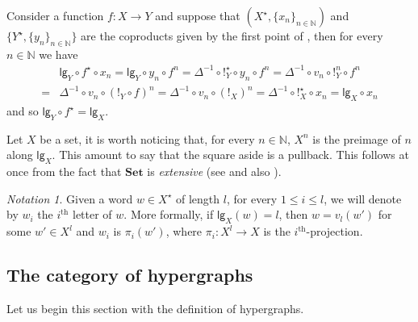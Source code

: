 \documentclass[3p]{elsarticle}
\newcommand{\lgh}{\mathsf{lg}}
\newcommand{\Set}{\mathbf{Set}}
\theoremstyle{remark}
\newtheorem*{notaz}{Notation}
\theoremstyle{definition}
\begin{document}
\begin{rem}\label{rem:le} Consider a function $f\colon X\to Y$  and suppose that $(X^\star, \{x_n\}_{n\in \mathbb{N}})$ and $\{Y^\star, \{y_n\}_{n\in \mathbb{N}}\}$ are the coproducts given by the first point of , then for every $n\in \mathbb{N}$ we have 
	\begin{align*}
&\lgh_{Y}\circ f^\star \circ x_n = \lgh_{Y}\circ y_n \circ f^n= \Delta^{-1}\circ !^\star_{Y} \circ y_n\circ f^n =  \Delta^{-1}\circ v_n \circ !^n_{Y} \circ f^n \\=& \Delta^{-1}\circ v_n \circ (!_{Y} \circ f)^n  = \Delta^{-1}\circ v_n \circ (!_{X})^n = \Delta^{-1}\circ !^\star_{X} \circ x_n = \lgh_{X}\circ x_n
	\end{align*}
and so $\lgh_{Y}\circ f^\star= \lgh_{X}$.
\end{rem}

\noindent
\begin{minipage}[r]{.83\linewidth}
	\begin{rem}\label{rem:len} Let $X$ be a set, it is worth noticing that, for every $n\in \mathbb{N}$, $X^n$ is the preimage of $n$ along $\lgh_{X}$. This amount to say that the square aside is a pullback. This follows at once from the fact that $\Set$ is \emph{extensive} (see \cite{carboni1993introduction} and also ). 
	\end{rem}
\end{minipage}\hfill \begin{minipage}[l]{.15\linewidth} \vspace{-.2cm}
\xymatrix@R=13pt{X^n \ar@{>->}[r]^{v_n} \ar[d]^{!_{X^n}}& X^\star  \ar[d]^{\lgh_{X}}\\ 1 \ar@{>->}[r]^{\delta_n} & \mathbb{N}}
\end{minipage}

\begin{notaz}
	Given a word $w\in X^\star$ of length $l$, for every $1\leq i \leq l$, we will denote by $w_i$ the $i^\mathrm{th}$ letter of $w$.   More formally, if $\lgh_X(w)=l$, then $w=v_l(w')$ for some $w'\in X^l$ and $w_i$ is $\pi_i(w')$, where $\pi_i\colon X^l\to X$ is the $i^\mathrm{th}$-projection.
\end{notaz}

\subsection{The category of hypergraphs}

Let us begin this section with the definition of hypergraphs.
\end{document}
